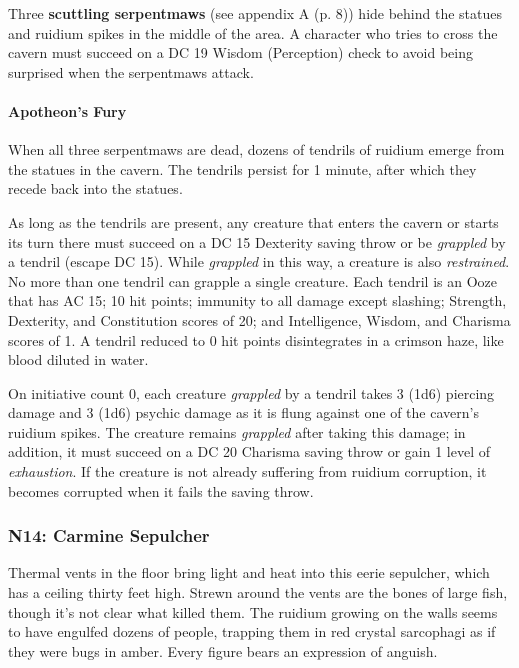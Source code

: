 \documentclass[letterpaper, 11pt, bg=full, twocolumn]{dndbook}
\begin{document}
Three \textbf{scuttling serpentmaws} (see appendix A (p. 8)) hide behind the statues and ruidium spikes in the middle of the area. A character who tries to cross the cavern must succeed on a DC 19 Wisdom (Perception) check to avoid being surprised when the serpentmaws attack.

\paragraph{Apotheon's Fury}

When all three serpentmaws are dead, dozens of tendrils of ruidium emerge from the statues in the cavern. The tendrils persist for 1 minute, after which they recede back into the statues.

As long as the tendrils are present, any creature that enters the cavern or starts its turn there must succeed on a DC 15 Dexterity saving throw or be \textit{grappled} by a tendril (escape DC 15). While \textit{grappled} in this way, a creature is also \textit{restrained}. No more than one tendril can grapple a single creature. Each tendril is an Ooze that has AC 15; 10 hit points; immunity to all damage except slashing; Strength, Dexterity, and Constitution scores of 20; and Intelligence, Wisdom, and Charisma scores of 1. A tendril reduced to 0 hit points disintegrates in a crimson haze, like blood diluted in water.

On initiative count 0, each creature \textit{grappled} by a tendril takes 3 (1d6) piercing damage and 3 (1d6) psychic damage as it is flung against one of the cavern's ruidium spikes. The creature remains \textit{grappled} after taking this damage; in addition, it must succeed on a DC 20 Charisma saving throw or gain 1 level of \textit{exhaustion}. If the creature is not already suffering from ruidium corruption, it becomes corrupted when it fails the saving throw.

\subsubsection{N14: Carmine Sepulcher}

\begin{DndReadAloud}
Thermal vents in the floor bring light and heat into this eerie sepulcher, which has a ceiling thirty feet high. Strewn around the vents are the bones of large fish, though it's not clear what killed them.
The ruidium growing on the walls seems to have engulfed dozens of people, trapping them in red crystal sarcophagi as if they were bugs in amber. Every figure bears an expression of anguish.
\end{DndReadAloud}
\end{document}
